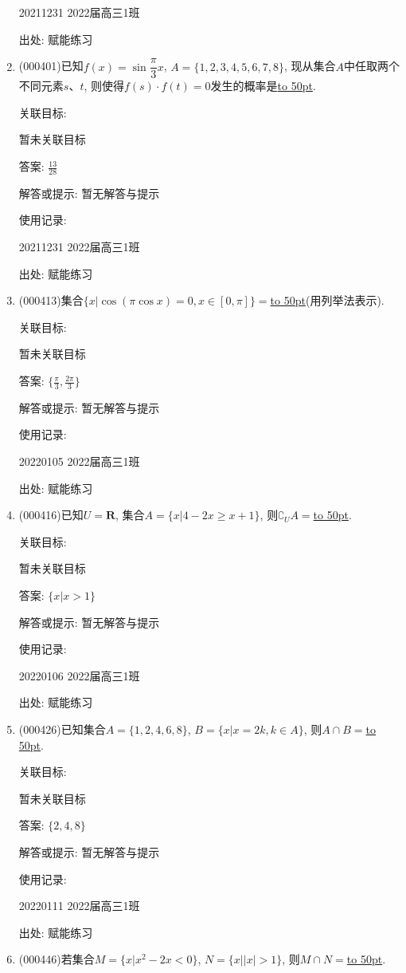\documentclass[10pt,a4paper]{article}
\newcommand{\blank}[1]{\underline{\hbox to #1pt{}}}
\begin{document}
\begin{enumerate}[1.]
20211231	2022届高三1班	


出处: 赋能练习
\item { (000401)}已知$f(x)=\sin\dfrac\pi 3x$, $A=\{1,2,3,4,5,6,7,8\}$, 现从集合$A$中任取两个不同元素$s$、$t$, 则使得$f(s)\cdot f(t)=0$发生的概率是\blank{50}.


关联目标:

暂未关联目标

答案: $\frac{13}{28}$

解答或提示: 暂无解答与提示

使用记录:

20211231	2022届高三1班	


出处: 赋能练习
\item { (000413)}集合$\{x|\cos (\pi \cos x)=0,x\in [0,\pi]\}=$\blank{50}(用列举法表示).


关联目标:

暂未关联目标

答案: $\{\frac{\pi }3,\frac{2\pi }3\}$

解答或提示: 暂无解答与提示

使用记录:

20220105	2022届高三1班	


出处: 赋能练习
\item { (000416)}已知$U=\mathbf{R}$, 集合$A=\{x|4-2x\ge x+1\}$, 则${\complement_U}A=$\blank{50}.


关联目标:

暂未关联目标

答案: $\{x|x>1\}$

解答或提示: 暂无解答与提示

使用记录:

20220106	2022届高三1班	


出处: 赋能练习
\item { (000426)}已知集合$A=\{1,2,4,6,8\}$, $B=\{x|x=2k,k\in A\}$, 则$A\cap B=$\blank{50}.


关联目标:

暂未关联目标

答案: $\{2,4,8\}$

解答或提示: 暂无解答与提示

使用记录:

20220111	2022届高三1班	


出处: 赋能练习
\item { (000446)}若集合$M=\{x|{x^2}-2x<0\}$, $N=\{x||x|>1\}$, 则$M\cap N=$\blank{50}.



\end{enumerate}
\end{document}
